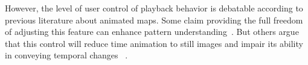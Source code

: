 \begin{comment}

``Data Visualization with Spacetime Maps'', Richard L. Brownrigg, 2005
(read further later on)

\grey{To be continued later:
\begin{enumerate}[label*=\arabic*.]
\item ``Geographic Visualization: Designing Manipulable Maps for
    Exploring Temporally Varying Georeferenced Statistics'', MacEachren et al.\
\item ``Strategies for the Visualization of Geographic Time-Series
    Data'', Mark Monmonier, 2011
\item ``Evaluation of Methods for Classifying Epidemiological Data
    on Choropleth Maps in Series'', Brewer and Pickle, 2002
\end{enumerate}}
\end{comment}



However, the level of user control of playback behavior is debatable
according to previous literature about animated maps. Some claim
providing the full freedom of adjusting this feature can enhance
pattern understanding~\cite{Nelson1998}. But others argue that this
control will reduce time animation to still images and impair its
ability in conveying temporal changes ~\cite{Lowe2004}.